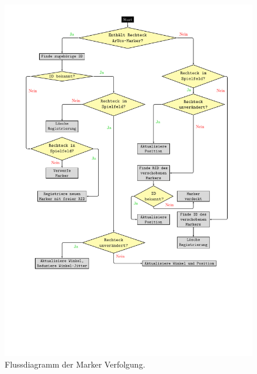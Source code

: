 \begin{figure}[htbp]
	\centering
	\includegraphics[scale=.8, trim=3cm 2.5cm 3.5cm 9 cm]{kapitel/system/MP_Marker_Erkennung.pdf}
	\caption{Flussdiagramm der Marker Verfolgung.}
	\label{fig:TrackingDiagram}
\end{figure}

